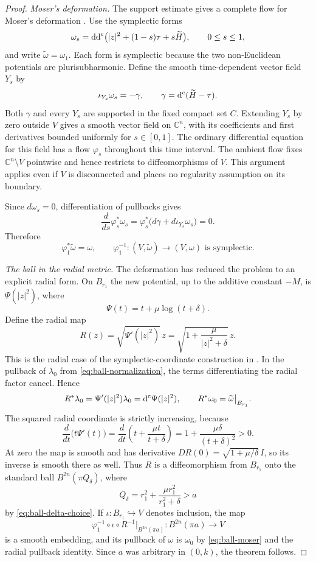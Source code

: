 \begin{proof}
\smallskip
\noindent\emph{Moser's deformation.} The support estimate gives a complete flow for Moser's deformation \cite[Section~4]{Moser1965}. Use the symplectic forms
\[
 \omega_s=\mathrm{dd}^{\mathrm{c}}\bigl(|z|^2+(1-s)\tau+s\widetilde H\bigr),
 \qquad 0\le s\le1,
\]
and write $\widetilde\omega=\omega_1$.  Each form is symplectic because the two non-Euclidean potentials are plurisubharmonic.  Define the smooth time-dependent vector field $Y_s$ by
\[
 \iota_{Y_s}\omega_s=-\gamma,
 \qquad \gamma=\mathrm{d}^{\mathrm{c}}(\widetilde H-\tau).
\]
Both $\gamma$ and every $Y_s$ are supported in the fixed compact set $C$.  Extending $Y_s$ by zero outside $V$ gives a smooth vector field on $\mathbb{C}^n$, with its coefficients and first derivatives bounded uniformly for $s\in[0,1]$.  The ordinary differential equation for this field has a flow $\varphi_s$ throughout this time interval. The ambient flow fixes $\mathbb{C}^n\setminus V$ pointwise and hence restricts to diffeomorphisms of $V$.  This argument applies even if $V$ is disconnected and places no regularity assumption on its boundary.

Since $d\omega_s=0$, differentiation of pullbacks gives
\[
 \frac{d}{ds}\varphi_s^*\omega_s
 =\varphi_s^*\bigl(d\gamma+d\iota_{Y_s}\omega_s\bigr)=0.
\]
Therefore
\begin{equation}
 \varphi_1^*\widetilde\omega=\omega,
 \qquad
 \varphi_1^{-1}:(V,\widetilde\omega)\longrightarrow(V,\omega)
 \text{ is symplectic}.
 \label{eq:ball-moser}
\end{equation}

\smallskip
\noindent\emph{The ball in the radial metric.} The deformation has reduced the problem to an explicit radial form. On $B_{r_1}$ the new potential, up to the additive constant $-M$, is $\Psi(|z|^2)$, where
\[
 \Psi(t)=t+\mu\log(t+\delta).
\]
Define the radial map
\[
 R(z)=\sqrt{\Psi'(|z|^2)}\,z
     =\sqrt{1+\frac\mu{|z|^2+\delta}}\,z.
\]
This is the radial case of the symplectic-coordinate construction in \cite[proof of Theorem~1.1, Equation~(23)]{LoiZuddas2008}. In the pullback of $\lambda_0$ from \eqref{eq:ball-normalization}, the terms differentiating the radial factor cancel.  Hence
\[
 R^*\lambda_0=\Psi'(|z|^2)\lambda_0=\mathrm{d}^{\mathrm{c}}\Psi(|z|^2),
 \qquad R^*\omega_0=\widetilde\omega\big|_{B_{r_1}}.
\]
The squared radial coordinate is strictly increasing, because
\[
 \frac{d}{dt}\bigl(t\Psi'(t)\bigr)
 =\frac{d}{dt}\left(t+\frac{\mu t}{t+\delta}\right)
 =1+\frac{\mu\delta}{(t+\delta)^2}>0.
\]
At zero the map is smooth and has derivative $DR(0)=\sqrt{1+\mu/\delta}\,I$, so its inverse is smooth there as well.  Thus $R$ is a diffeomorphism from $B_{r_1}$ onto the standard ball $B^{2n}(\pi Q_\delta)$, where
\[
 Q_\delta=r_1^2+\frac{\mu r_1^2}{r_1^2+\delta}>a
\]
by \eqref{eq:ball-delta-choice}.  If $\iota:B_{r_1}\hookrightarrow V$ denotes inclusion, the map
\[
 \varphi_1^{-1}\circ\iota\circ
       R^{-1}\big|_{B^{2n}(\pi a)}:
 B^{2n}(\pi a)\longrightarrow V
\]
is a smooth embedding, and its pullback of $\omega$ is $\omega_0$ by \eqref{eq:ball-moser} and the radial pullback identity. Since $a$ was arbitrary in $(0,k)$, the theorem follows.
\end{proof}
